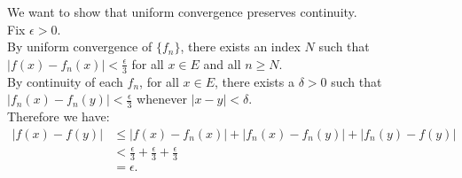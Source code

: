 \begin{enumerate}
	We want to show that uniform convergence preserves continuity.\\
	Fix $\epsilon>0$.\\
	By uniform convergence of $\{f_n\}$, there exists an index $N$ such that $|f(x)-f_n(x)|<\frac{\epsilon}{3}$ for all $x\in E$ and all $n\ge N$.\\
	By continuity of each $f_n$, for all $x\in E$, there exists a $\delta>0$ such that $|f_n(x)-f_n(y)|<\frac{\epsilon}{3}$ whenever $|x-y|<\delta$.\\
	Therefore we have:
	\begin{align*}
		|f(x)-f(y)|&\le|f(x)-f_n(x)|+|f_n(x)-f_n(y)|+|f_n(y)-f(y)|\\
		&<\frac{\epsilon}{3}+\frac{\epsilon}{3}+\frac{\epsilon}{3}\\
		&=\epsilon.
	\end{align*}
\end{enumerate}
